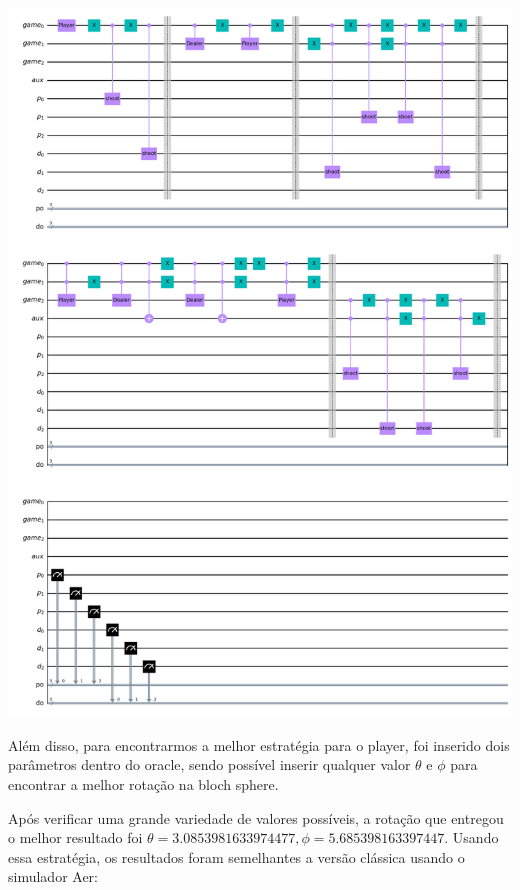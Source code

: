 \documentclass{article}
\begin{document}
\begin{center}
	\includegraphics[scale=0.3]{quantum_buckshot_roulette.png}
	\label{fig:bckr-circuit}
\end{center}

Além disso, para encontrarmos a melhor estratégia para o player, foi inserido dois parâmetros dentro do oracle, sendo possível inserir qualquer valor $\theta$ e $\phi$ para encontrar a melhor rotação na bloch sphere. 

Após verificar uma grande variedade de valores possíveis, a rotação que entregou o melhor resultado foi $\theta = 3.0853981633974477, \phi=5.685398163397447$.
Usando essa estratégia, os resultados foram semelhantes a versão clássica usando o simulador Aer:
\end{document}
